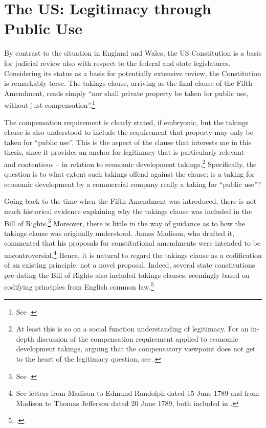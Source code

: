 
\section{The US: Legitimacy through Public Use}\label{sec:3:3}

By contrast to the situation in England and Wales, the US Constitution is a basis for judicial review also with respect to the federal and state legislatures. Considering its status as a basis for potentially extensive review, the Constitution is remarkably terse. The takings clause, arriving as the final clause of the Fifth Amendment, reads simply ``nor shall private property be taken for public use, without just compensation''.\footnote{See \cite{fifth}.}

The compensation requirement is clearly stated, if embryonic, but the takings clause is also understood to include the requirement that property may only be taken for ``public use''. This is the aspect of the clause that interests me in this thesis, since it provides an anchor for legitimacy that is particularly relevant -- and contentious -- in relation to economic development takings.\footnote{At least this is so on a social function understanding of legitimacy. For an in-depth discussion of the compensation requirement applied to economic development takings, arguing that the compensatory viewpoint does not get to the heart of the legitimacy question, see \cite{dyrkolbotn15}.} Specifically, the question is to what extent such takings offend against the clause: is a taking for economic development by a commercial company really a taking for ``public use''?

Going back to the time when the Fifth Amendment was introduced, there is not much historical evidence explaining why the takings clause was included in the Bill of Rights.\footnote{See \cite{fifth}.} Moreover, there is little in the way of guidance as to how the takings clause was originally understood. James Madison, who drafted it, commented that his proposals for constitutional amendments were intended to be uncontroversial.\footnote{See letters from Madison to Edmund Randolph dated 15 June 1789 and from Madison to Thomas Jefferson dated 20 June 1789, both included in \cite{madison79}.} Hence, it is natural to regard the takings clause as a codification of an existing principle, not a novel proposal. Indeed, several state constitutions pre-dating the Bill of Rights also included takings clauses, seemingly based on codifying principles from English common law.\footcite[See][299]{johnson11} 

